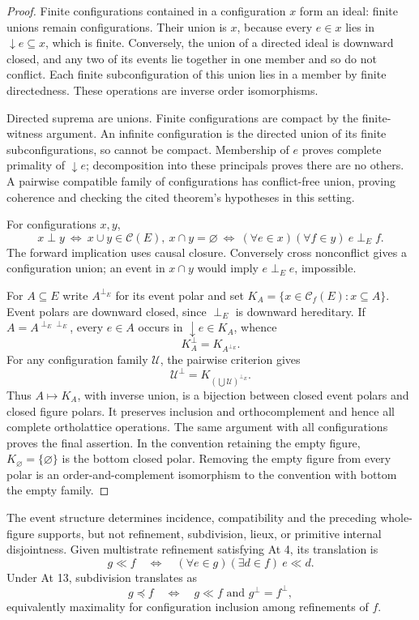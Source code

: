 \begin{proof}
Finite configurations contained in a configuration \(x\)
form an ideal: finite unions remain configurations.
Their union is \(x\), because every \(e\in x\) lies
in \(\downarrow e\subseteq x\), which is finite.
Conversely, the union of a directed ideal is downward
closed, and any two of its events lie together in
one member and so do not conflict. Each finite
subconfiguration of this union lies in a member
by finite directedness. These operations are
inverse order isomorphisms.

Directed suprema are unions. Finite configurations
are compact by the finite-witness argument.
An infinite configuration is the directed union
of its finite subconfigurations, so cannot be
compact. Membership of \(e\) proves complete
primality of \(\downarrow e\); decomposition
into these principals proves there are no
others. A pairwise compatible family of
configurations has conflict-free union, proving
coherence and checking the cited theorem's
hypotheses in this setting.

For configurations \(x,y\),
\[
 x\perp y
 \ \Longleftrightarrow\
 x\cup y\in\mathcal C(E),\ x\cap y=\varnothing
 \ \Longleftrightarrow\
 (\forall e\in x)(\forall f\in y)\ e\perp_Ef .
\]
The forward implication uses causal closure.
Conversely cross nonconflict gives a configuration
union; an event in \(x\cap y\) would imply
\(e\perp_Ee\), impossible.

For \(A\subseteq E\) write \(A^{\perp_E}\) for
its event polar and set
\(K_A=\{x\in\mathcal C_f(E):x\subseteq A\}\).
Event polars are downward closed, since
\(\perp_E\) is downward hereditary.
If \(A=A^{\perp_E\perp_E}\), every \(e\in A\)
occurs in \(\downarrow e\in K_A\), whence
\[
 K_A^\perp=K_{A^{\perp_E}}.
\]
For any configuration family \(\mathcal U\),
the pairwise criterion gives
\[
 \mathcal U^\perp=K_{(\bigcup\mathcal U)^{\perp_E}}.
\]
Thus \(A\mapsto K_A\), with inverse union,
is a bijection between closed event polars
and closed figure polars. It preserves
inclusion and orthocomplement and hence
all complete ortholattice operations.
The same argument with all configurations
proves the final assertion. In the convention retaining
the empty figure, \(K_\varnothing=\{\varnothing\}\)
is the bottom closed polar. Removing the empty figure
from every polar is an order-and-complement isomorphism
to the convention with bottom the empty family.
\end{proof}

\begin{proposition}\label{SA21-BM-refinement}
The event structure determines incidence, compatibility
and the preceding whole-figure supports, but not refinement,
subdivision, lieux, or primitive internal disjointness.
Given multistrate refinement satisfying At 4, its translation is
\[
 g\ll f\quad\Longleftrightarrow\quad
 (\forall e\in g)(\exists d\in f)\ e\ll d .
\]
Under At 13, subdivision translates as
\[
 g\preceq f\quad\Longleftrightarrow\quad
 g\ll f\text{ and }g^\perp=f^\perp,
\]
equivalently maximality for configuration inclusion among
refinements of \(f\).
\end{proposition}

